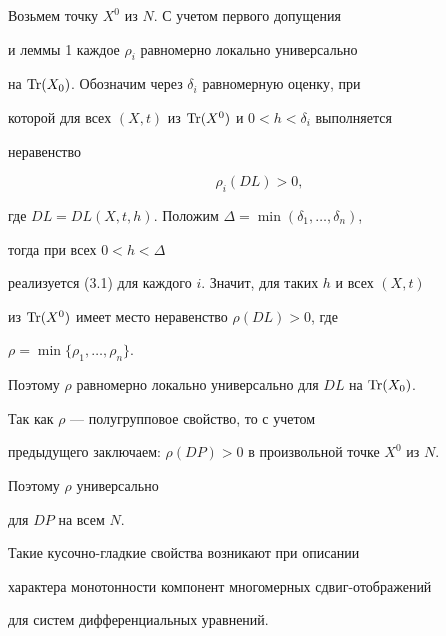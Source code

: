 \begin{pf} 


Возьмем точку $X^0$ из $N$. С учетом первого допущения 


и леммы 1 каждое $\rho_i$ равномерно локально универсально 


на $\operatorname{Tr}(X_0)$. Обозначим через $\delta_i$ равномерную оценку, при 


которой для всех $(X,t)$ из $\operatorname{Tr}(X^0)$ и $0<h<\delta_i$ выполняется 


неравенство 


\begin{equation} 


\rho_i(D L)>0, 


\end{equation} 


где $D L=D L(X,t,h)$. Положим $\Delta=\min(\delta_1,\dotsc,\delta_n)$, 


тогда при всех $0<h<\Delta$ 


реализуется (3.1) для каждого $i$. Значит, для таких $h$ и всех $(X,t)$ 


из $\operatorname{Tr}(X^0)$ имеет место неравенство $\rho(D L)>0$, где 


$\rho=\min\{\rho_1,\dotsc,\rho_n\}$. 


Поэтому $\rho$ равномерно локально универсально для $D L$ на $\operatorname{Tr}(X_0)$. 


Так как $\rho$ --- полугрупповое свойство, то с учетом 


предыдущего заключаем: $\rho(D P)>0$ в произвольной точке $X^0$ из $N$. 


Поэтому $\rho$ универсально 


для $D P$ на всем $N$. 


\end{pf} 


 


Такие кусочно-гладкие свойства возникают при описании 


характера монотонности компонент многомерных сдвиг-отображений 


для систем дифференциальных уравнений. 


 



